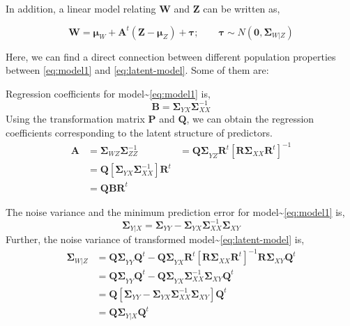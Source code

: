 \documentclass[12pt,A4paper,authoryear]{elsarticle} %
\providecommand{\tightlist}{%
  \setlength{\itemsep}{0pt}\setlength{\parskip}{0pt}}
\begin{document}
In addition, a linear model relating \(\mathbf{W}\) and \(\mathbf{Z}\)
can be written as,

\begin{equation}
  \mathbf{W} =  \boldsymbol{\mu}_W + \mathbf{A}^t \left(\mathbf{Z} - \boldsymbol{\mu}_Z\right) + \boldsymbol{\tau}; \qquad
  \boldsymbol{\tau} \sim N\left(\mathbf{0}, \boldsymbol{\Sigma}_{W|Z}\right)
  \label{eq:latent-model}
\end{equation}

Here, we can find a direct connection between different population
properties between \eqref{eq:model1} and \eqref{eq:latent-model}. Some of
them are:

\begin{description}
\tightlist
\item[Regression Coefficients]
Regression coefficients for model\textasciitilde{}\eqref{eq:model1} is,
\[\mathbf{B} = \boldsymbol{\Sigma}_{YX} \boldsymbol{\Sigma}_{XX}^{-1}\]
Using the transformation matrix \(\mathbf{P}\) and \(\mathbf{Q}\), we
can obtain the regression coefficients corresponding to the latent
structure of predictors. \[
  \begin{aligned}
\mathbf{A} &= \boldsymbol{\Sigma}_{WZ} \boldsymbol{\Sigma}_{ZZ}^{-1}
  &= \boldsymbol{Q\Sigma}_{YZ}\mathbf{R}^t\left[\boldsymbol{R\Sigma}_{XX}\mathbf{R}^t\right]^{-1} \\
  &= \mathbf{Q}\left[\boldsymbol{\Sigma}_{YX}\boldsymbol{\Sigma}_{XX}^{-1}\right]\mathbf{R}^t \\
  &= \mathbf{QBR}^t
  \end{aligned}
  \]
\item[Error Variance]
The noise variance and the minimum prediction error for
model\textasciitilde{}\eqref{eq:model1} is,
\[\boldsymbol{\Sigma}_{Y|X} = \boldsymbol{\Sigma}_{YY} - \boldsymbol{\Sigma}_{YX} \boldsymbol{\Sigma}_{XX}^{-1} \boldsymbol{\Sigma}_{XY}\]
Further, the noise variance of transformed
model\textasciitilde{}\eqref{eq:latent-model} is, \[
  \begin{aligned}
\boldsymbol{\Sigma}_{W|Z}
&= \boldsymbol{Q\Sigma}_{YY}\mathbf{Q}^t -
  \boldsymbol{Q \Sigma}_{YX}\mathbf{R}^t \left[\boldsymbol{R\Sigma}_{XX}\boldsymbol{R}^t\right]^{-1}
  \boldsymbol{R\Sigma}_{XY}\mathbf{Q}^t \nonumber \\
&= \boldsymbol{Q\Sigma}_{YY}\mathbf{Q}^t - 
  \boldsymbol{Q \Sigma}_{YX}\boldsymbol{\Sigma}_{XX}^{-1}\boldsymbol{\Sigma}_{XY}\mathbf{Q}^t \nonumber \\
&= \mathbf{Q}\left[\boldsymbol{\Sigma}_{YY} -
  \boldsymbol{\Sigma}_{YX}\boldsymbol{\Sigma}_{XX}^{-1}\boldsymbol{\Sigma}_{XY}\right]\mathbf{Q}^{t} \nonumber \\
&= \mathbf{Q} \boldsymbol{\Sigma}_{Y|X}\mathbf{Q}^t
  \end{aligned}
  \]
\end{description}
\end{document}
